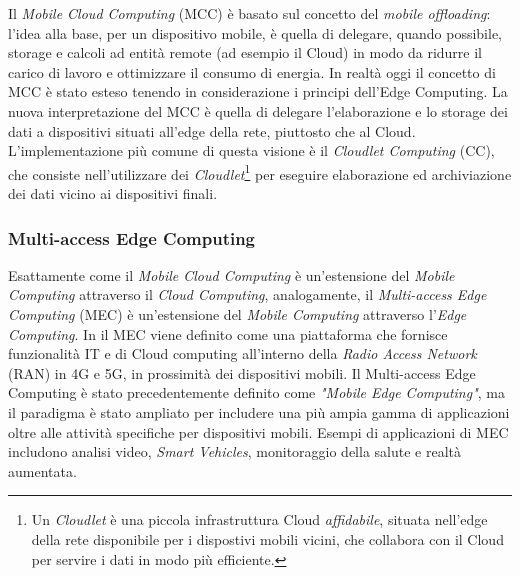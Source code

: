 Il \textit{Mobile Cloud Computing} (MCC) è basato sul concetto del \textit{mobile offloading}: l'idea alla base, per un dispositivo mobile, è quella di delegare, quando possibile, storage e calcoli ad entità remote (ad esempio il Cloud) in modo da ridurre il carico di lavoro e ottimizzare il consumo di energia. In realtà oggi il concetto di MCC è stato esteso tenendo in considerazione i principi dell'Edge Computing. La nuova interpretazione del MCC è quella di delegare l'elaborazione e lo storage dei dati a dispositivi situati all'edge della rete, piuttosto che al Cloud. L'implementazione più comune di questa visione è il \textit{Cloudlet Computing} (CC), che consiste nell'utilizzare dei \textit{Cloudlet}\footnote{Un \textit{Cloudlet} è una piccola infrastruttura Cloud \textit{affidabile}, situata nell'edge della rete disponibile per i dispostivi mobili vicini, che collabora con il Cloud per servire i dati in modo più efficiente.} per eseguire elaborazione ed archiviazione dei dati vicino ai dispositivi finali.

\subsubsection{Multi-access Edge Computing}

Esattamente come il \textit{Mobile Cloud Computing} è un'estensione del \textit{Mobile Computing} attraverso il \textit{Cloud Computing}, analogamente, il \textit{Multi-access Edge Computing} (MEC) è un'estensione del \textit{Mobile Computing} attraverso l'\textit{Edge Computing}. In \cite{MultiAccessEdgeComputing} il MEC viene definito come una piattaforma che fornisce funzionalità IT e di Cloud computing all'interno della \textit{Radio Access Network} (RAN) in 4G e 5G, in prossimità dei dispositivi mobili. Il Multi-access Edge Computing è stato precedentemente definito come \textit{"Mobile Edge Computing"}, ma il paradigma è stato ampliato per includere una più ampia gamma di applicazioni oltre alle attività specifiche per dispositivi mobili. Esempi di applicazioni di MEC includono analisi video, \textit{Smart Vehicles}, monitoraggio della salute e realtà aumentata.


